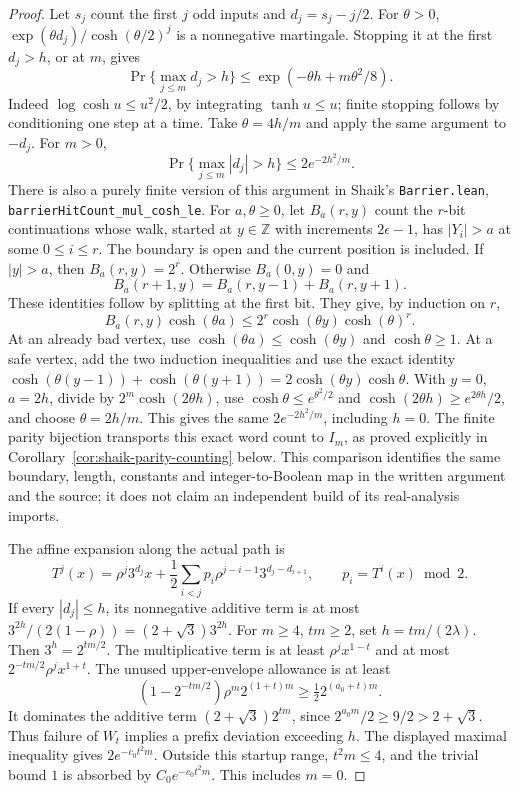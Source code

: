 \documentclass[11pt]{article}
\theoremstyle{remark}\newtheorem{remark}[proposition]{Remark}
\begin{document}
\begin{proof}
Let \(s_j\) count the first \(j\) odd inputs and \(d_j=s_j-j/2\).
For \(\theta>0\),
\(\exp(\theta d_j)/\cosh(\theta/2)^j\) is a nonnegative martingale.
Stopping it at the first \(d_j>h\), or at \(m\), gives
\[
 \Pr\{\max_{j\le m}d_j>h\}
 \le \exp(-\theta h+m\theta^2/8).
\]
Indeed \(\log\cosh u\le u^2/2\), by integrating
\(\tanh u\le u\); finite stopping follows by conditioning one step at
a time. Take \(\theta=4h/m\) and apply the same argument to \(-d_j\).
For \(m>0\),
\[
 \Pr\{\max_{j\le m}|d_j|>h\}\le2e^{-2h^2/m}.
\]
There is also a purely finite version of this argument in Shaik's
\texttt{Barrier.lean}, \texttt{barrierHitCount\_mul\_cosh\_le}.
For \(a,\theta\ge0\), let \(B_a(r,y)\) count the \(r\)-bit continuations
whose walk, started at \(y\in\mathbb Z\) with increments \(2\epsilon-1\),
has \(|Y_i|>a\) at some \(0\le i\le r\). The boundary is open and the
current position is included. If \(|y|>a\), then \(B_a(r,y)=2^r\).
Otherwise \(B_a(0,y)=0\) and
\[
 B_a(r+1,y)=B_a(r,y-1)+B_a(r,y+1).
\]
These identities follow by splitting at the first bit. They give,
by induction on \(r\),
\[
 B_a(r,y)\cosh(\theta a)
 \le 2^r\cosh(\theta y)\cosh(\theta)^r .
\]
At an already bad vertex, use
\(\cosh(\theta a)\le\cosh(\theta y)\) and \(\cosh\theta\ge1\).
At a safe vertex, add the two induction inequalities and use the
exact identity
\(\cosh(\theta(y-1))+\cosh(\theta(y+1))
=2\cosh(\theta y)\cosh\theta\).
With \(y=0\), \(a=2h\), divide by \(2^m\cosh(2\theta h)\), use
\(\cosh\theta\le e^{\theta^2/2}\) and
\(\cosh(2\theta h)\ge e^{2\theta h}/2\), and choose
\(\theta=2h/m\). This gives the same
\(2e^{-2h^2/m}\), including \(h=0\). The finite parity bijection
transports this exact word count to \(I_m\), as proved explicitly
in Corollary~\ref{cor:shaik-parity-counting} below. This comparison
identifies the same boundary, length, constants and integer-to-Boolean
map in the written argument and the source; it does not claim an
independent build of its real-analysis imports.

The affine expansion along the actual path is
\[
 T^j(x)=\rho^j3^{d_j}x+
 \frac12\sum_{i<j}p_i\rho^{j-i-1}3^{d_j-d_{i+1}},
 \qquad p_i=T^i(x)\bmod2 .
\]
If every \(|d_j|\le h\), its nonnegative additive term is at most
\(3^{2h}/(2(1-\rho))=(2+\sqrt3)3^{2h}\).
For \(m\ge4\), \(tm\ge2\), set \(h=tm/(2\lambda)\).
Then \(3^h=2^{tm/2}\). The multiplicative term is at least
\(\rho^jx^{1-t}\) and at most \(2^{-tm/2}\rho^jx^{1+t}\).
The unused upper-envelope allowance is at least
\[
 (1-2^{-tm/2})\rho^m2^{(1+t)m}
 \ge \tfrac12 2^{(a_0+t)m}.
\]
It dominates the additive term \((2+\sqrt3)2^{tm}\), since
\(2^{a_0m}/2\ge9/2>2+\sqrt3\).
Thus failure of \(W_t\) implies a prefix deviation exceeding \(h\).
The displayed maximal inequality gives \(2e^{-c_0t^2m}\).
Outside this startup range, \(t^2m\le4\), and the trivial bound \(1\)
is absorbed by \(C_0e^{-c_0t^2m}\). This includes \(m=0\).
\end{proof}
\end{document}
